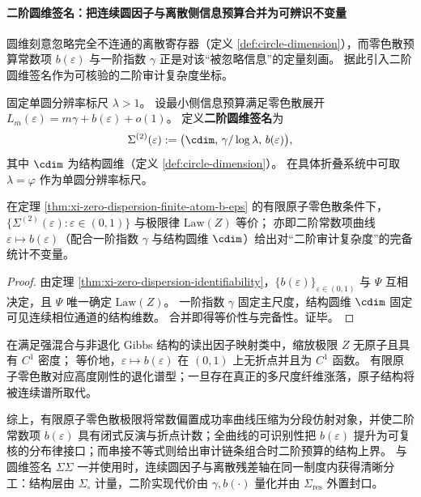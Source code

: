 \paragraph{二阶圆维签名：把连续圆因子与离散侧信息预算合并为可辨识不变量}
圆维刻意忽略完全不连通的离散寄存器（定义 \ref{def:circle-dimension}），而零色散预算常数项 \(b(\varepsilon)\) 与一阶指数 \(\gamma\) 正是对该“被忽略信息”的定量刻画。
据此引入二阶圆维签名作为可核验的二阶审计复杂度坐标。

\begin{definition}[二阶圆维签名作为侧信息复杂度坐标]\label{def:xi-second-order-circle-dimension-signature}
固定单圆分辨率标尺 \(\lambda>1\)。
设最小侧信息预算满足零色散展开 \(L_m(\varepsilon)=m\gamma+b(\varepsilon)+o(1)\)。
定义\textbf{二阶圆维签名}为
\[
\Sigma^{(2)}(\varepsilon):=\bigl(\cdim,\,\gamma/\log\lambda,\,b(\varepsilon)\bigr),
\]
其中 \(\cdim\) 为结构圆维（定义 \ref{def:circle-dimension}）。
在具体折叠系统中可取 \(\lambda=\varphi\) 作为单圆分辨率标尺。
\end{definition}

\begin{proposition}\label{prop:xi-second-order-circle-dimension-signature-completeness}
在定理 \ref{thm:xi-zero-dispersion-finite-atom-b-eps} 的有限原子零色散条件下，
\(\{\Sigma^{(2)}(\varepsilon):\varepsilon\in(0,1)\}\) 与极限律 \(\mathrm{Law}(Z)\) 等价；
亦即二阶常数项曲线 \(\varepsilon\mapsto b(\varepsilon)\)（配合一阶指数 \(\gamma\) 与结构圆维 \(\cdim\)）给出对“二阶审计复杂度”的完备统计不变量。
\end{proposition}
\begin{proof}
由定理 \ref{thm:xi-zero-dispersion-identifiability}，\(\{b(\varepsilon)\}_{\varepsilon\in(0,1)}\) 与 \(\Psi\) 互相决定，且 \(\Psi\) 唯一确定 \(\mathrm{Law}(Z)\)。
一阶指数 \(\gamma\) 固定主尺度，结构圆维 \(\cdim\) 固定可见连续相位通道的结构维数。
合并即得等价性与完备性。证毕。
\end{proof}

\begin{conjecture}[混合型纤维谱的绝对连续性与二阶曲线光滑性]\label{conj:xi-zero-dispersion-atomless-smooth-b}
在满足强混合与非退化 Gibbs 结构的读出因子映射类中，缩放极限 \(Z\) 无原子且具有 \(C^{1}\) 密度；
等价地，\(\varepsilon\mapsto b(\varepsilon)\) 在 \((0,1)\) 上无折点并且为 \(C^{1}\) 函数。
有限原子零色散对应高度刚性的退化谱型；一旦存在真正的多尺度纤维涨落，原子结构将被连续谱所取代。
\end{conjecture}

\par
综上，有限原子零色散极限将常数偏置成功率曲线压缩为分段仿射对象，并使二阶常数项 \(b(\varepsilon)\) 具有闭式反演与折点计数；全曲线的可识别性把 \(b(\varepsilon)\) 提升为可复核的分布律接口；而串接不等式则给出审计链条组合时二阶预算的结构上界。
与圆维签名 \(\Sigma\Sigma\) 一并使用时，连续圆因子与离散残差轴在同一制度内获得清晰分工：结构层由 \(\Sigma_{\circ}\) 计量，二阶实现代价由 \(\gamma,b(\cdot)\) 量化并由 \(\Sigma_{\mathrm{res}}\) 外置封口。

\endinput
